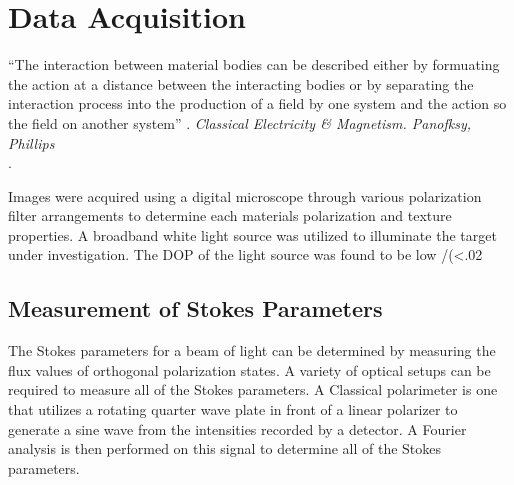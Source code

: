 \chapter{Data Acquisition}
\begin{center}
  \begin{minipage}{0.75\textwidth}
    \begin{small}
      “The interaction between material bodies can be described either by formuating the action at a distance between the interacting bodies or by separating the interaction process into the production of a field by one system and the action so the field on another system” .
      \emph{Classical Electricity \& Magnetism. Panofksy, Phillips}\\.
    \end{small}
  \end{minipage}
  \vspace{0.5cm}
\end{center}

Images were acquired using a digital microscope through various polarization filter arrangements to determine each materials polarization and texture properties.  A broadband white light source was utilized to illuminate the target under investigation.  The DOP of the light source was found to be low /(<.02%

\section{Measurement of Stokes Parameters}
The Stokes parameters for a beam of light can be determined by measuring the flux values of orthogonal polarization states.  A variety of optical setups can be required to measure all of the Stokes parameters.  A Classical polarimeter is one that utilizes a rotating quarter wave plate in front of a linear polarizer to generate a sine wave from the intensities recorded by a detector.  A Fourier analysis is then performed on this signal to determine all of the Stokes parameters.


